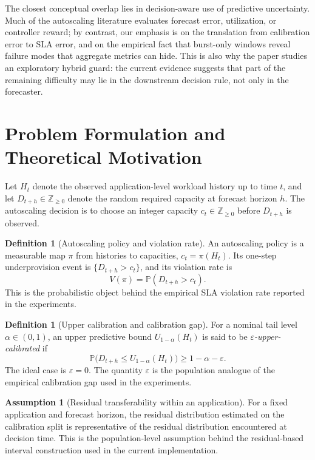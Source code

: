\documentclass[11pt]{article}
\theoremstyle{plain}
\theoremstyle{definition}
\newtheorem{definition}[theorem]{Definition}
\newtheorem{assumption}[theorem]{Assumption}
\theoremstyle{remark}
\begin{document}
The closest conceptual overlap lies in decision-aware use of predictive uncertainty. Much of the autoscaling literature evaluates forecast error, utilization, or controller reward; by contrast, our emphasis is on the translation from calibration error to SLA error, and on the empirical fact that burst-only windows reveal failure modes that aggregate metrics can hide. This is also why the paper studies an exploratory hybrid guard: the current evidence suggests that part of the remaining difficulty may lie in the downstream decision rule, not only in the forecaster.

\section{Problem Formulation and Theoretical Motivation}
Let $H_t$ denote the observed application-level workload history up to time $t$, and let $D_{t+h} \in \mathbb{Z}_{\ge 0}$ denote the random required capacity at forecast horizon $h$. The autoscaling decision is to choose an integer capacity $c_t \in \mathbb{Z}_{\ge 0}$ before $D_{t+h}$ is observed.

\begin{definition}[Autoscaling policy and violation rate]
An autoscaling policy is a measurable map $\pi$ from histories to capacities, $c_t=\pi(H_t)$. Its one-step underprovision event is $\{D_{t+h}>c_t\}$, and its violation rate is
\[
V(\pi)=\mathbb{P}(D_{t+h}>c_t).
\]
This is the probabilistic object behind the empirical SLA violation rate reported in the experiments.
\end{definition}

\begin{definition}[Upper calibration and calibration gap]
For a nominal tail level $\alpha \in (0,1)$, an upper predictive bound $U_{1-\alpha}(H_t)$ is said to be \emph{$\varepsilon$-upper-calibrated} if
\[
\mathbb{P}\!\bigl(D_{t+h} \le U_{1-\alpha}(H_t)\bigr) \ge 1-\alpha-\varepsilon.
\]
The ideal case is $\varepsilon=0$. The quantity $\varepsilon$ is the population analogue of the empirical calibration gap used in the experiments.
\end{definition}

\begin{assumption}[Residual transferability within an application]
For a fixed application and forecast horizon, the residual distribution estimated on the calibration split is representative of the residual distribution encountered at decision time. This is the population-level assumption behind the residual-based interval construction used in the current implementation.
\end{assumption}
\end{document}
